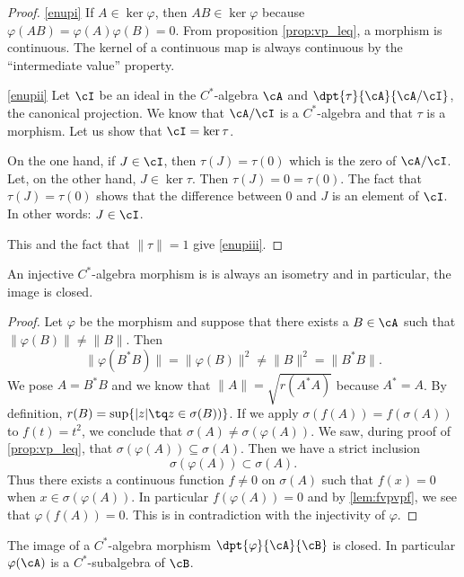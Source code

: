 \begin{proof}
\ref{enupi} If $A\in\ker\varphi$, then $AB\in\ker\varphi$ because $\varphi(AB)=\varphi(A)\varphi(B)=0$. From proposition \ref{prop:vp_leq}, a morphism is continuous. The kernel of a continuous map is always continuous by the ``intermediate value'' property.

\ref{enupii} Let $\cI$ be an ideal in the $C^*$-algebra $\cA$ and $\dpt{\tau}{\cA}{\cA/\cI}$, the canonical projection. We know that $\cA/\cI$ is a $C^*$-algebra and that $\tau$ is a morphism. Let us show that $\cI=\ker\tau$.

On the one hand, if $J\in\cI$, then $\tau(J)=\tau(0)$ which is the zero of $\cA/\cI$. Let, on the other hand, $J\in\ker\tau$. Then $\tau(J)=0=\tau(0)$. The fact that $\tau(J)=\tau(0)$ shows that the difference between $0$ and $J$ is an element of $\cI$. In other words: $J\in\cI$.

This and the fact that $\| \tau \|=1$ give \ref{enupiii}.

\end{proof}

\begin{lemma}  \label{lem:injmorpisom}
An injective $C^*$-algebra morphism is is always an isometry and in particular, the image is closed.
\end{lemma}

\begin{proof}
Let $\varphi$ be the morphism and suppose that there exists a $B\in\cA$ such that $\| \varphi(B) \|\neq \| B \|$. Then
\[ 
  \| \varphi(B^*B) \|=\| \varphi(B) \|^2\neq\| B \|^2=\| B^*B \|.
\]
We pose $A=B^*B$ and we know that $\| A \|=\sqrt{r(A^*A)}$ because $A^*=A$. By definition, $r(B)=\sup\{ | z |\tq z\in\sigma(B)) \}$. If we apply $\sigma(f(A))=f(\sigma(A))$ to $f(t)=t^2$, we conclude that $\sigma(A)\neq\sigma(\varphi(A))$. We saw, during proof of \ref{prop:vp_leq}, that $\sigma(\varphi(A))\subseteq\sigma(A)$. Then we have a strict inclusion 
\[ 
   \sigma(\varphi(A))\subset\sigma(A).
\]
Thus there exists a continuous function $f\neq 0$ on $\sigma(A)$ such that $f(x)=0$ when $x\in\sigma(\varphi(A))$. In particular $f(\varphi(A))=0$ and by \ref{lem:fvpvpf}, we see that $\varphi(f(A))=0$. This is in contradiction with the injectivity of $\varphi$. 

\end{proof}

\begin{corollary}
The image of a $C^*$-algebra morphism $\dpt{\varphi}{\cA}{\cB}$ is closed. In particular $\varphi(\cA)$ is a $C^*$-subalgebra of $\cB$.
\end{corollary}

